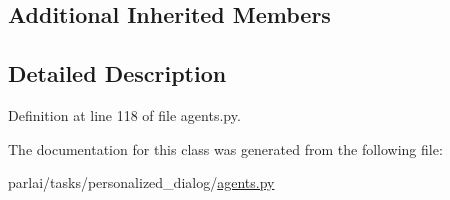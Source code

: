 \subsection*{Additional Inherited Members}


\subsection{Detailed Description}


Definition at line 118 of file agents.\+py.



The documentation for this class was generated from the following file\+:\begin{DoxyCompactItemize}
\item 
parlai/tasks/personalized\+\_\+dialog/\hyperlink{parlai_2tasks_2personalized__dialog_2agents_8py}{agents.\+py}\end{DoxyCompactItemize}
